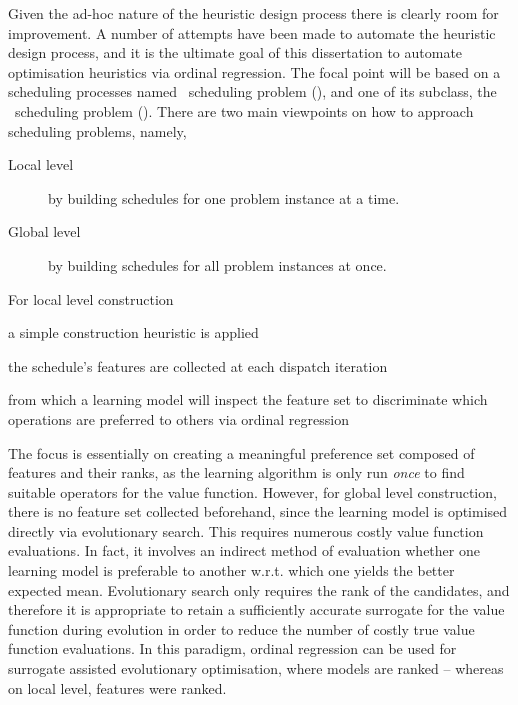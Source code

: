 Given the ad-hoc nature of the heuristic design process there is clearly room 
for improvement. A number of attempts have been made to automate the heuristic 
design process, and it is the ultimate goal of this dissertation to automate 
optimisation heuristics via ordinal regression. 
The focal point will be based on a scheduling processes named \jsp\ scheduling 
problem (\JSP), and one of its subclass, the \fsp\ scheduling problem 
(\FSP).
There are two main viewpoints on how to approach scheduling problems, namely,
\begin{description}
  \item[Local level] by building schedules for one problem instance at a time.
  \item[Global level] by building schedules for all problem instances at once.
\end{description}
For local level construction
\begin{enumerate*}[label={{}}]
  \item a simple construction heuristic is applied 
  \item the schedule's features are collected at each dispatch iteration
  \item from which a learning model will inspect the feature set to 
  discriminate which operations are preferred to others via ordinal regression 
\end{enumerate*}
The focus is essentially on creating a meaningful preference set composed of 
features and their ranks, as the learning algorithm is only run \emph{once} to 
find suitable operators for the value function. 
However, for global level construction, there is no feature set collected 
beforehand, since the learning model is optimised directly via evolutionary 
search. This requires numerous costly value function evaluations. 
In fact, it involves an indirect method of evaluation whether one learning 
model is preferable to another w.r.t. which one yields the better expected 
mean. 
Evolutionary search only requires the rank of the candidates, and therefore it 
is appropriate to retain a sufficiently accurate surrogate for the value 
function during evolution in order to reduce the number of costly true value 
function evaluations. 
In this paradigm, ordinal regression can be used for surrogate assisted 
evolutionary optimisation, where models are ranked -- whereas on local level, 
features were ranked. 

